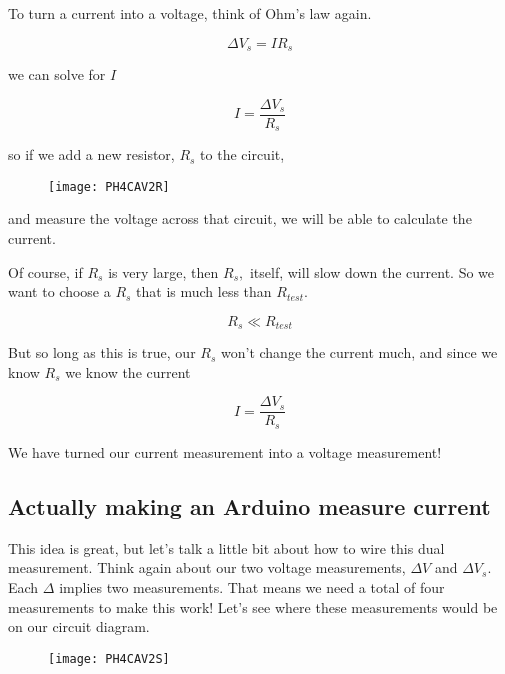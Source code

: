To turn a current into a voltage, think of Ohm's law again.

\begin{equation*}
	\Delta V_{s}=IR_{s}
\end{equation*}

\noindent we can solve for $I$

\begin{equation*}
	I=\frac{\Delta V_{s}}{R_{s}}
\end{equation*}

\noindent so if we add a new resistor, $R_{s}$ to the circuit,

\begin{figure}[h!]
	\texttt{[image: PH4CAV2R]}
\end{figure}

\noindent and measure the voltage across that circuit, we will be able to calculate the current.

Of course, if $R_{s}$ is very large, then $R_{s},$ itself, will slow down
the current. So we want to choose a $R_{s}$ that is much less than $R_{test}. $

\begin{equation*}
	R_{s}\ll R_{test}
\end{equation*}

\noindent But so long as this is true, our $R_{s}$ won't change the current much, and since we know $R_{s}$ we know the current 

\begin{equation*}
	I=\frac{\Delta V_{s}}{R_{s}}
\end{equation*}

\noindent We have turned our current measurement into a voltage measurement!

\subsection{Actually making an Arduino measure current}

This idea is great, but let's talk a little bit about how to wire this dual
measurement. Think again about our two voltage measurements, $\Delta V$ and $\Delta V_{s}.$ Each $\Delta $ implies two measurements. That means we need a total of four measurements to make this work! Let's see where these
measurements would be on our circuit diagram.

\begin{figure}[h!]
	\centering
	\texttt{[image: PH4CAV2S]}
\end{figure}

